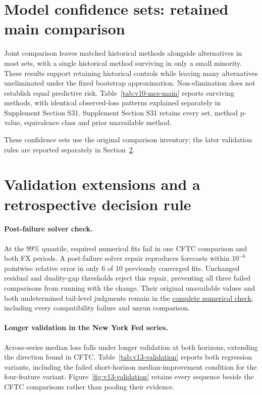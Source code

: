 \section{Model confidence sets: retained main comparison}\label{sup:v13-mcs}

Joint comparison leaves matched historical methods alongside alternatives in most sets, with a single historical method surviving in only a small minority. These results support retaining historical controls while leaving many alternatives uneliminated under the fixed bootstrap approximation. Non-elimination does not establish equal predictive risk. Table~\ref{tab:v10-mcs-main} reports surviving methods, with identical observed-loss patterns explained separately in Supplement Section S31. Supplement Section S31 retains every set, method p-value, equivalence class and prior unavailable method.

These confidence sets use the original comparison inventory; the later validation rules are reported separately in Section~\ref{sup:v13-checks}.



\FloatBarrier
\section{Validation extensions and a retrospective decision rule}\label{sup:v13-checks}

\paragraph{Post-failure solver check.}
At the 99\% quantile, required numerical fits fail in one CFTC comparison and both FX periods. A post-failure solver repair reproduces forecasts within $10^{-6}$ pointwise relative error in only 6 of 10 previously converged fits. Unchanged residual and duality-gap thresholds reject this repair, preventing all three failed comparisons from running with the change. Their original unavailable values and both undetermined tail-level judgments remain in the \href{https://github.com/ByronLi0207/financial-mathematics-paper-20261020/tree/revision-v13/results/v13/tau-repair}{complete numerical check}, including every compatibility failure and unrun comparison.

\paragraph{Longer validation in the New York Fed series.}
Across-series median loss falls under longer validation at both horizons, extending the direction found in CFTC. Table~\ref{tab:v13-validation} reports both regression variants, including the failed short-horizon median-improvement condition for the four-feature variant. Figure~\ref{fig:v13-validation} retains every sequence beside the CFTC comparisons rather than pooling their evidence.

